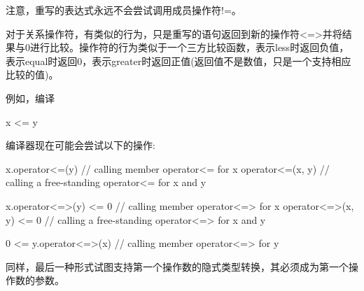 注意，重写的表达式永远不会尝试调用成员操作符!=。


对于关系操作符，有类似的行为，只是重写的语句返回到新的操作符<=>并将结果与0进行比较。操作符的行为类似于一个三方比较函数，表示less时返回负值，表示equal时返回0，表示greater时返回正值(返回值不是数值，只是一个支持相应比较的值)。

例如，编译

\begin{cpp}
x <= y
\end{cpp}

编译器现在可能会尝试以下的操作:

\begin{cpp}
x.operator<=(y) // calling member operator<= for x
operator<=(x, y) // calling a free-standing operator<= for x and y

x.operator<=>(y) <= 0 // calling member operator<=> for x
operator<=>(x, y) <= 0 // calling a free-standing operator<=> for x and y

0 <= y.operator<=>(x) // calling member operator<=> for y
\end{cpp}

同样，最后一种形式试图支持第一个操作数的隐式类型转换，其必须成为第一个操作数的参数。






